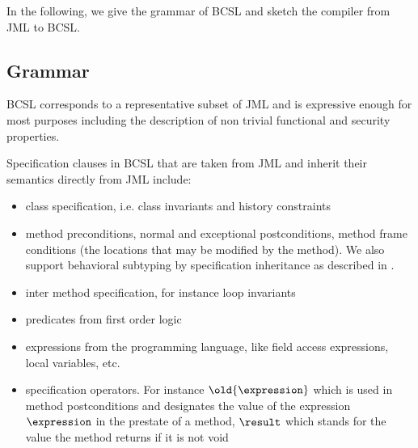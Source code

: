 In the following, we give the grammar of BCSL and sketch the compiler from JML to BCSL. 

\subsection{Grammar} \label{grammar}


BCSL corresponds to a representative subset of JML and is expressive enough for most purposes including the description of non trivial functional and 
 security properties.

 Specification clauses in BCSL that are taken from JML and inherit their semantics directly from JML include:
\begin{itemize}
   \item class specification, i.e. class invariants and history constraints
   \item  method preconditions, normal and exceptional postconditions, method frame conditions (the locations that may be modified by the method). 
     We also support behavioral subtyping by specification inheritance as described in \cite{Dhara-Leavens95b}.
   \item inter method specification, for instance loop invariants
   \item predicates from first order logic   
      
\item expressions from the programming language, like field access expressions, local variables, etc.
\item specification operators. For instance  $\old{\expression}$ which is used in method postconditions and
 designates the value of the expression $\expression$ in the prestate of a method, $ \result$ which stands for the value the method
returns if it is not void  
\end{itemize}

